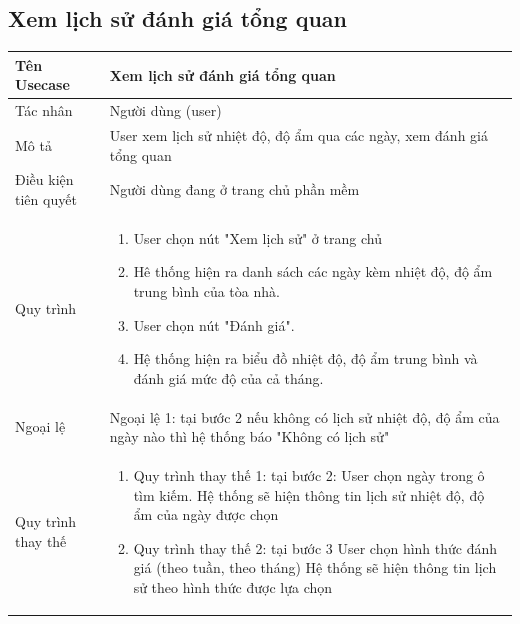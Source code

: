 \subsection{Xem lịch sử đánh giá tổng quan}
\begin{center}
	\begin{tabular}{|p{4cm}|p{10cm}|}
		\hline
		Tên Usecase & Xem lịch sử đánh giá tổng quan\\ \hline
		Tác nhân & Người dùng (user)\\ \hline
		Mô tả & User xem lịch sử nhiệt độ, độ ẩm qua các ngày, xem đánh giá tổng quan \\ \hline
		
		Điều kiện tiên quyết & Người dùng đang ở trang chủ phần mềm \\ \hline
		Quy trình & \begin{enumerate}
			\item User chọn nút "Xem lịch sử" ở trang chủ
			\item Hê thống hiện ra danh sách các ngày kèm nhiệt độ, độ ẩm trung bình của tòa nhà.
			\item User chọn nút "Đánh giá".
			\item Hệ thống hiện ra biểu đồ nhiệt độ, độ ẩm trung bình và đánh giá mức độ của cả tháng.
		\end{enumerate}\\ \hline
		Ngoại lệ & Ngoại lệ 1: tại bước 2
		nếu không có lịch sử nhiệt độ, độ ẩm của ngày nào thì hệ thống báo "Không có lịch sử" \\ \hline
		Quy trình thay thế & \begin{enumerate}
			\item Quy trình thay thế 1: tại bước 2:
			\subitem User chọn ngày trong ô tìm kiếm.
			\subitem Hệ thống sẽ hiện thông tin lịch sử nhiệt độ, độ ẩm của ngày được chọn
			\item Quy trình thay thế 2: tại bước 3
			\subitem  User chọn hình thức đánh giá (theo tuần, theo tháng)
			\subitem Hệ thống sẽ hiện thông tin lịch sử theo hình thức được lựa chọn
			
		\end{enumerate} \\ \hline
		
	\end{tabular}
\end{center}
\newpage

